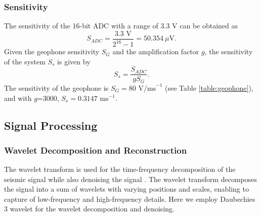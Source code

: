 \documentclass[applsci,article,accept,moreauthors,pdftex]{Definitions/mdpi}
\begin{document}
\subsubsection{Sensitivity}
The sensitivity of the 16-bit ADC with a range of 3.3 V can be obtained as
\begin{equation}
	S_{ADC}=\frac{3.3 \text{ V}}{2^{16} - 1} = 50.354\ \mu \text{V}.\label{eq:Sadc}
\end{equation}
Given the geophone sensitivity $S_{G}$ and the amplification factor $g$, the sensitivity  of the system $S_{s}$ is given by 
\begin{equation}
	S_{s} = \frac{S_{ADC}}{gS_{G}}.
	\label{eq:sens}
\end{equation}
The sensitivity of the geophone is $S_{G}=80 \text{ V/ms}^{-1}$ (see Table \ref{table:geophone}), and with $g$=3000, $S_{s}=0.3147$ ms$^{-1}$. 
\subsection {Signal Processing}
\subsubsection{Wavelet Decomposition and Reconstruction}
The wavelet transform is used for the time-frequency decomposition of the seismic signal while also denoising the signal \cite{donoho1995noising}. The wavelet transform decomposes the signal into a sum of wavelets with varying positions and scales, enabling to capture of low-frequency and high-frequency details. Here we employ Daubechies 3 wavelet for the wavelet decomposition and denoising.
\end{document}
